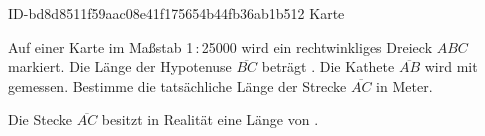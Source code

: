 \begin{exercise}
      {ID-bd8d8511f59aac08e41f175654b44fb36ab1b512}
      {Karte}
  \ifproblem\problem\par
    Auf einer Karte im Maßstab 1\,:\,\num{25000} wird ein rechtwinkliges Dreieck
    $ABC$ markiert. Die Länge der Hypotenuse $\overline{BC}$ beträgt .
    Die Kathete $\overline{AB}$ wird mit  gemessen. Bestimme die
    tatsächliche Länge der Strecke $\overline{AC}$ in Meter.
  \fi
  \ifoutcome\outcome\par
    Die Stecke $\overline{AC}$ besitzt in Realität eine Länge von .
  \fi
\end{exercise}
